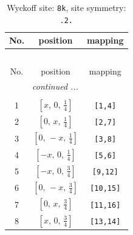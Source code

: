 \documentclass[fleqn,8pt]{jsarticle}
\begin{document}
\begin{longtable}{ccc}
\caption{Wyckoff site: {\tt 8k}, site symmetry: {\tt .2.}}
 \\
 \hline \hline
No. & position & mapping \\ \hline \endfirsthead

\multicolumn{2}{l}{\tablename\ \thetable{}} \\
 \hline \hline
No. & position & mapping \\ \hline \endhead

 \hline \hline
\multicolumn{2}{r}{\footnotesize\it continued ...} \\ \endfoot

 \hline \hline
\multicolumn{2}{r}{} \\ \endlastfoot

1 & $\left[ x,\, 0,\, \frac{1}{4} \right]$ & {\tt [1,4]} \\ \hline
2 & $\left[ 0,\, x,\, \frac{1}{4} \right]$ & {\tt [2,7]} \\ \hline
3 & $\left[ 0,\, - x,\, \frac{1}{4} \right]$ & {\tt [3,8]} \\ \hline
4 & $\left[ - x,\, 0,\, \frac{1}{4} \right]$ & {\tt [5,6]} \\ \hline
5 & $\left[ - x,\, 0,\, \frac{3}{4} \right]$ & {\tt [9,12]} \\ \hline
6 & $\left[ 0,\, - x,\, \frac{3}{4} \right]$ & {\tt [10,15]} \\ \hline
7 & $\left[ 0,\, x,\, \frac{3}{4} \right]$ & {\tt [11,16]} \\ \hline
8 & $\left[ x,\, 0,\, \frac{3}{4} \right]$ & {\tt [13,14]} \\
\end{longtable}
\renewcommand{\arraystretch}{1.2}
\end{document}

